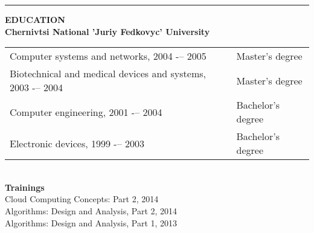 \documentclass{article}
\begin{document}
{\color{lightgray}\hrule height 0.2mm} \vspace{2mm}
\noindent
\textbf{EDUCATION}\\
\textbf{Chernivtsi National 'Juriy Fedkovyc' University}\\
\noindent\begin{tabular}{@{}ll}
  Computer systems and networks, 2004 -– 2005                & Master's degree \\
  Biotechnical and medical devices and systems, 2003 -– 2004 & Master's degree \\
  Computer engineering, 2001 -– 2004                         & Bachelor's degree   \\
  Electronic devices, 1999 -– 2003                           & Bachelor's degree   \\
\end{tabular}\\
\noindent
\textbf{Trainings}\\
  Cloud Computing Concepts: Part 2, 2014 \\
  Algorithms: Design and Analysis, Part 2, 2014 \\
  Algorithms: Design and Analysis, Part 1, 2013 \\
\end{document}
